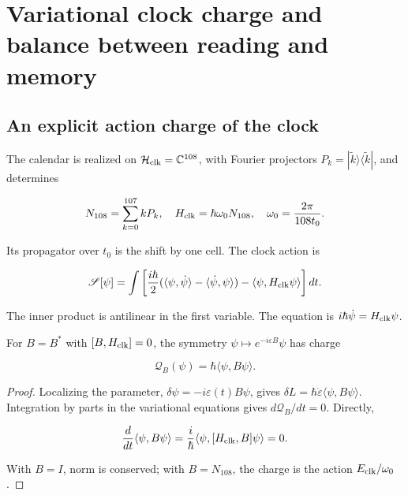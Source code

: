 \section{Variational clock charge and balance between reading and memory}

\subsection{An explicit action charge of the clock}

The calendar is realized on \(\mathcal H_{\rm clk}=\mathbb C^{108}\), with Fourier projectors \(P_k=|\widetilde k\rangle\langle\widetilde k|\), and determines

\begin{equation}
N_{108}=\sum_{k=0}^{107}kP_k,\quad
H_{\rm clk}=\hbar\omega_0N_{108},\quad
\omega_0=\frac{2\pi}{108t_0}.
\label{x_reciprocidad:nuc07:eq:12}
\end{equation}

Its propagator over \(t_0\) is the shift by one cell. The clock action is

\begin{equation}
\mathscr S[\psi]=\int
\left[\frac{i\hbar}{2}
(\langle\psi,\dot\psi\rangle-\langle\dot\psi,\psi\rangle)
-\langle\psi,H_{\rm clk}\psi\rangle\right]dt.
\label{x_reciprocidad:nuc07:eq:13}
\end{equation}

The inner product is antilinear in the first variable. The equation is \(i\hbar\dot\psi=H_{\rm clk}\psi\).

\begin{proposition}
For \(B=B^*\) with \([B,H_{\rm clk}]=0\), the symmetry \(\psi\mapsto e^{-i\varepsilon B}\psi\) has charge

\begin{equation}
\mathcal Q_B(\psi)=\hbar\langle\psi,B\psi\rangle.
\label{x_reciprocidad:nuc07:eq:14}
\end{equation}
\end{proposition}

\begin{proof}
Localizing the parameter, \(\delta\psi=-i\varepsilon(t)B\psi\), gives \(\delta L=\hbar\dot\varepsilon\langle\psi,B\psi\rangle\). Integration by parts in the variational equations gives \(d\mathcal Q_B/dt=0\). Directly,

\[
\frac{d}{dt}\langle\psi,B\psi\rangle
=\frac{i}{\hbar}\langle\psi,[H_{\rm clk},B]\psi\rangle=0.
\]

With \(B=I\), norm is conserved; with \(B=N_{108}\), the charge is the action \(E_{\rm clk}/\omega_0\).
\end{proof}

